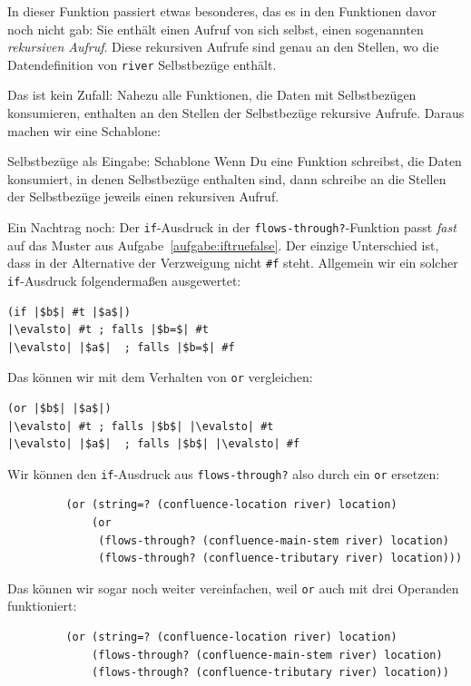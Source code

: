In dieser Funktion passiert etwas besonderes, das es in den
Funktionen davor noch nicht gab: Sie enthält einen Aufruf von sich
selbst, einen sogenannten \textit{rekursiven Aufruf}.  Diese rekursiven Aufrufe sind genau an den Stellen, wo
die Datendefinition von \lstinline{river} Selbstbezüge enthält.

Das ist kein Zufall: Nahezu alle Funktionen, die Daten mit
Selbstbezügen konsumieren, enthalten an den Stellen der Selbstbezüge
rekursive Aufrufe.  Daraus machen wir eine Schablone:
%
\begin{konstruktionsanleitung}{Selbstbezüge als Eingabe: Schablone}
  \label{ka:selbstbezug-schablone}
  Wenn Du eine Funktion schreibst, die Daten konsumiert, in denen
  Selbstbezüge enthalten sind, dann schreibe an die Stellen der
  Selbstbezüge jeweils einen rekursiven Aufruf.
\end{konstruktionsanleitung}
%
Ein Nachtrag noch: Der \lstinline{if}-Ausdruck in der
\lstinline{flows-through?}-Funktion passt \emph{fast} auf das Muster
aus Aufgabe~\ref{aufgabe:iftruefalse}.  Der einzige Unterschied ist,
dass in der Alternative der Verzweigung nicht \lstinline{#f} steht.
Allgemein wir ein solcher \lstinline{if}-Ausdruck folgendermaßen
ausgewertet:
%
\begin{lstlisting}
(if |$b$| #t |$a$|)
|\evalsto| #t ; falls |$b=$| #t
|\evalsto| |$a$|  ; falls |$b=$| #f
\end{lstlisting}
%
Das können wir mit dem Verhalten von \lstinline{or} vergleichen:
%
\begin{lstlisting}
(or |$b$| |$a$|)
|\evalsto| #t ; falls |$b$| |\evalsto| #t
|\evalsto| |$a$|  ; falls |$b$| |\evalsto| #f
\end{lstlisting}
%
Wir können den \lstinline{if}-Ausdruck aus \lstinline{flows-through?}
also durch ein \lstinline{or} ersetzen:
%
\begin{lstlisting}
         (or (string=? (confluence-location river) location)
             (or
              (flows-through? (confluence-main-stem river) location)
              (flows-through? (confluence-tributary river) location)))
\end{lstlisting}
%
Das können wir sogar noch weiter vereinfachen, weil \lstinline{or}
auch mit drei Operanden funktioniert:
%
\begin{lstlisting}
         (or (string=? (confluence-location river) location)
             (flows-through? (confluence-main-stem river) location)
             (flows-through? (confluence-tributary river) location))
\end{lstlisting}
